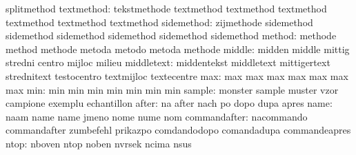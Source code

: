                            splitmethod
               textmethod: tekstmethode              textmethod
                           textmethod                textmethod
                           textmethod                textmethod
                           textmethod
               sidemethod: zijmethode                sidemethod
                           sidemethod                sidemethod
                           sidemethod                sidemethod
                           sidemethod
                   method: methode                   method
                           methode                   metoda
                           metodo                    metoda
                           methode
                   middle: midden                    middle
                           mittig                    stredni
                           centro                    mijloc
                           milieu
               middletext: middentekst               middletext
                           mittigertext              strednitext
                           testocentro               textmijloc
                           textecentre
                      max: max                       max
                           max                       max
                           max                       max
                           max
                      min: min                       min
                           min                       min
                           min                       min
                           min
                   sample: monster                   sample
                           muster                    vzor
                           campione                  exemplu
                           echantillon
                    after: na                        after
                           nach                      po
                           dopo                      dupa
                           apres
                     name: naam                      name
                           name                      jmeno
                           nome                      nume
                           nom
             commandafter: nacommando                commandafter
                           zumbefehl                 prikazpo
                           comdandodopo              comandadupa
                           commandeapres
                     ntop: nboven                    ntop
                           noben                     nvrsek
                           ncima                     nsus
